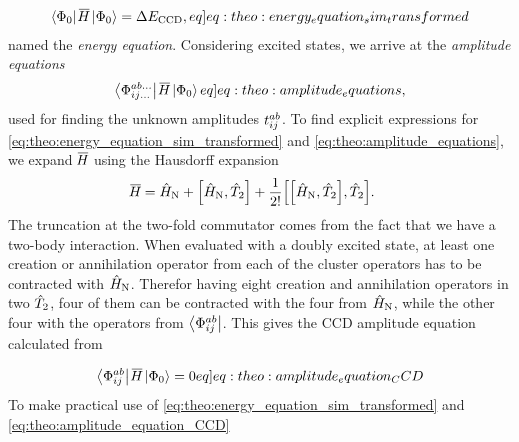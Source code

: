 \begin{align}
    \braansatz \simham \ketansatz = \DECCD, \label[eq]{eq:theo:energy_equation_sim_transformed}
\end{align}
named the \textit{energy equation}. Considering excited states, we arrive at the \textit{amplitude equations}
\begin{align}
    \braexed{ab\ldots}{ij\ldots} \simham \ketansatz \label[eq]{eq:theo:amplitude_equations},
\end{align}
used for finding the unknown amplitudes $t^{ab}_{ij}$. To find explicit expressions for \cref{eq:theo:energy_equation_sim_transformed} and \cref{eq:theo:amplitude_equations}, we expand $\overline{\mkern-1.9mu H\mkern-0.9mu}$ using the Hausdorff expansion
\begin{align*}
    \simham &= \hamno + \commutator{\hamno}{\cluster{2}} + \frac{1}{2!}\commutator{\commutator{\hamno}{\cluster{2}}}{\cluster{2}}.
\end{align*}
The truncation at the two-fold commutator comes from the fact that we have a two-body interaction. When evaluated with a doubly excited state, at least one creation or annihilation operator from each of the cluster operators has to be contracted with $\hat{H}_\text{N}$. Therefor having eight creation and annihilation operators in two $\hat{T}_{2}$, four of them can be contracted with the four from $\hat{H}_\text{N}$, while the other four with the operators from $\bra{\Phi^{ab}_{ij}}$. This gives the CCD amplitude equation calculated from 

\begin{align}
    \braexed{ab}{ij}\simham\ketansatz = 0 \label[eq]{eq:theo:amplitude_equation_CCD}
\end{align}
To make practical use of \cref{eq:theo:energy_equation_sim_transformed} and \cref{eq:theo:amplitude_equation_CCD}